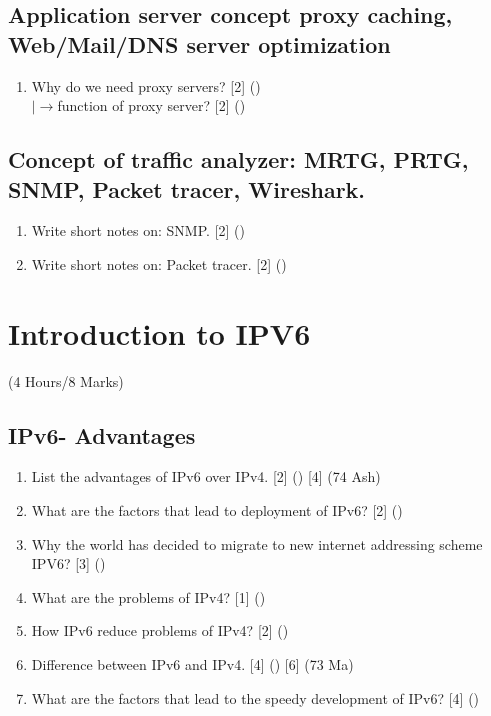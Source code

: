 \documentclass[12pt]{article}
\newcommand{\lb}{\\$\left|\rightarrow\right.$}
\begin{document}
	\subsection{Application server concept proxy caching, Web/Mail/DNS server optimization}
		\begin{enumerate}[noitemsep, topsep=0pt]
			\item Why do we need proxy servers? \hfill [2] ()
			\lb function of proxy server? \hfill [2] ()
		\end{enumerate}

	\subsection{Concept of traffic analyzer: MRTG, PRTG, SNMP, Packet tracer, Wireshark.}
		\begin{enumerate}[noitemsep, topsep=0pt]
			\item Write short notes on: SNMP. \hfill [2] ()

			\item Write short notes on: Packet tracer. \hfill [2] ()
		\end{enumerate}

	\pagebreak

\section{Introduction to IPV6}
	\begin{center}(4 Hours/8 Marks)\end{center}
	\subsection{IPv6- Advantages}
		\begin{enumerate}[noitemsep, topsep=0pt]
			\item List the advantages of IPv6 over IPv4. \hfill [2] () [4] (74 Ash)

			\item What are the factors that lead to deployment of IPv6? \hfill [2] ()

			\item Why the world has decided to migrate to new internet addressing scheme IPV6? \hfill [3] ()

			\item What are the problems of IPv4? \hfill [1] ()

			\item How IPv6 reduce problems of IPv4? \hfill [2] ()

			\item Difference between IPv6 and IPv4. \hfill [4] () [6] (73 Ma)

			\item What are the factors that lead to the speedy development of IPv6? \hfill [4] ()
		\end{enumerate}
\end{document}
